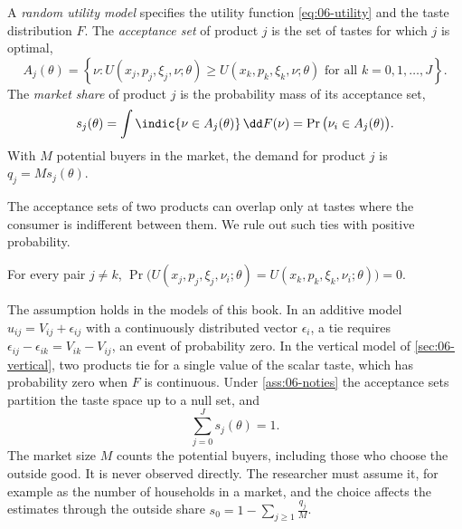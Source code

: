 \begin{definition}\label{def:06-rum}
A \emph{random utility model} specifies the utility function \eqref{eq:06-utility} and the taste distribution
$F$. The \emph{acceptance set} of product $j$ is the set of tastes for which $j$ is optimal,
\begin{equation}\label{eq:06-acceptance}
A_j(\theta) = \left\{\nu : U(x_j, p_j, \xi_j, \nu; \theta) \ge U(x_k, p_k, \xi_k, \nu; \theta)
\text{ for all } k = 0, 1, \dots, J\right\}.
\end{equation}
The \emph{market share} of product $j$ is the probability mass of its acceptance set,
\begin{equation}\label{eq:06-share}
s_j(\theta) = \int \indic\{\nu \in A_j(\theta)\}\,\dd F(\nu) = \Pr\big(\nu_i \in A_j(\theta)\big).
\end{equation}
With $M$ potential buyers in the market, the demand for product $j$ is $q_j = M s_j(\theta)$.
\end{definition}

The acceptance sets of two products can overlap only at tastes where the consumer is indifferent between them.
We rule out such ties with positive probability.

\begin{assumption}[No ties]\label{ass:06-noties}
For every pair $j \neq k$,
$\Pr\big(U(x_j, p_j, \xi_j, \nu_i; \theta) = U(x_k, p_k, \xi_k, \nu_i; \theta)\big) = 0$.
\end{assumption}

The assumption holds in the models of this book. In an additive model $u_{ij} = V_{ij} + \epsilon_{ij}$ with a
continuously distributed vector $\epsilon_i$, a tie requires $\epsilon_{ij} - \epsilon_{ik} = V_{ik} - V_{ij}$,
an event of probability zero. In the vertical model of \cref{sec:06-vertical}, two products tie for a single
value of the scalar taste, which has probability zero when $F$ is continuous. Under \cref{ass:06-noties} the
acceptance sets partition the taste space up to a null set, and
\begin{equation*}
\sum_{j=0}^{J} s_j(\theta) = 1 .
\end{equation*}
The market size $M$ counts the potential buyers, including those who choose the outside good. It is never
observed directly. The researcher must assume it, for example as the number of households in a market, and
the choice affects the estimates through the outside share $s_0 = 1 - \sum_{j \ge 1}\frac{q_j}{M}$.

